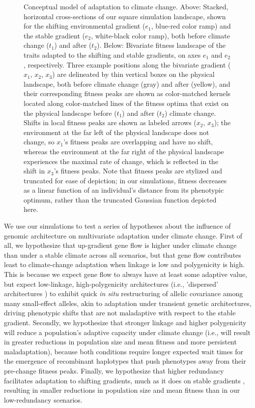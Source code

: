 \documentclass[9pt,twocolumn,twoside,lineno]{pnas-new}
\begin{document}
\begin{figure}
    \caption{Conceptual model of adaptation to climate change. Above: Stacked, horizontal cross-sections of our square simulation landscape, shown for the shifting environmental gradient ($e_{1}$, blue-red color ramp) and the stable gradient ($e_{2}$, white-black color ramp), both before climate change ($t_{1}$) and after ($t_{2}$). Below: Bivariate fitness landscape of the traits adapted to the shifting and stable gradients, on axes $e_{1}$ and $e_{2}$, respectively. Three example positions along the bivariate gradient ($x_{1}$, $x_{2}$, $x_{3}$) are delineated by thin vertical boxes on the physical landscape, both before climate change (gray) and after (yellow), and their corresponding fitness peaks are shown as color-matched kernels located along color-matched lines of the fitness optima that exist on the physical landscape before ($t_{1}$) and after ($t_{2}$) climate change. Shifts in local fitness peaks are shown as labeled arrows ($x_{2}$, $x_{3}$); the environment at the far left of the physical landscape does not change, so $x_{1}$'s fitness peaks are overlapping and have no shift, whereas the environment at the far right of the physical landscape experiences the maximal rate of change, which is reflected in the shift in $x_{3}$'s fitness peaks. Note that fitness peaks are stylized and truncated for ease of depiction; in our simulations, fitness decreases as a linear function of an individual's distance from its phenotypic optimum, rather than the truncated Gaussian function depicted here.}
\label{fig:fig_1}
\end{figure}


We use our simulations to test a series of hypotheses about the influence of genomic architecture 
on multivariate adaptation under climate change. First of all, we hypothesize that up-gradient 
gene flow is higher under climate change than under a stable climate across all
scenarios, but that gene flow contributes least to climate-change adaptation when
linkage is low and polygenicity is high.
This is because we expect gene flow to always have
at least some adaptive value, but expect low-linkage, high-polygenicity architectures 
(i.e., 'dispersed' architectures \cite{yeaman_review}) to exhibit quick \textit{in situ}
restructuring of allelic covariance among many small-effect alleles, akin to adaptation 
under transient genetic architectures, driving phenotypic shifts that are not maladaptive 
with respect to the stable gradient. Secondly, we hypothesize that stronger linkage 
and higher polygenicity will reduce a population's adaptive capacity under climate change
(i.e., will result in greater reductions in population size and mean fitness
and more persistent maladaptation), because both conditions require longer expected
wait times for the emergence of recombinant haplotypes that push phenotypes
away from their pre-change fitness peaks. Finally, we hypothesize that higher redundancy
facilitates adaptation to shifting gradients, much as it does on stable gradients 
\cite{barghi_redundancy,manceau,yeaman_amnat}, resulting in smaller reductions 
in population size and mean fitness than in our low-redundancy scenarios.
\end{document}
